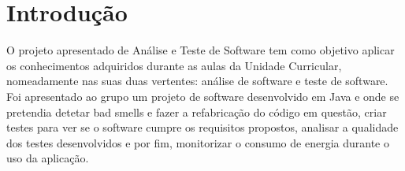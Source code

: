 \chapter*{Introdução} 

O projeto apresentado de Análise e Teste de Software tem como objetivo aplicar os conhecimentos adquiridos durante as aulas da Unidade Curricular, nomeadamente nas suas duas vertentes: análise de software e teste de software.
Foi apresentado ao grupo um projeto de software desenvolvido em Java e onde se pretendia detetar bad smells e fazer a refabricação do código em questão, criar testes para ver se o software cumpre os requisitos propostos, analisar a qualidade dos testes desenvolvidos e por fim, monitorizar o consumo de energia durante o uso da aplicação.